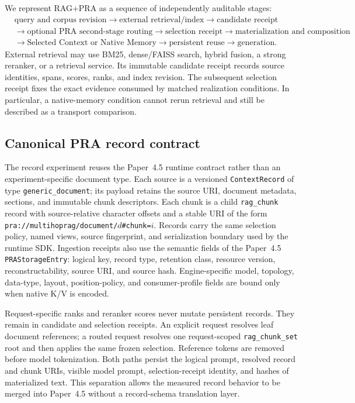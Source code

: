 \documentclass[11pt]{article}
\begin{document}
We represent RAG+PRA as a sequence of independently auditable stages:
\[
\begin{split}
&\text{query and corpus revision}
\rightarrow \text{external retrieval/index}
\rightarrow \text{candidate receipt}\\
&\rightarrow \text{optional PRA second-stage routing}
\rightarrow \text{selection receipt}
\rightarrow \text{materialization and composition}\\
&\rightarrow \text{Selected Context or Native Memory}
\rightarrow \text{persistent reuse}
\rightarrow \text{generation}.
\end{split}
\]
External retrieval may use BM25, dense/FAISS search, hybrid fusion, a strong
reranker, or a retrieval service. Its immutable candidate receipt records
source identities, spans, scores, ranks, and index revision. The subsequent
selection receipt fixes the exact evidence consumed by matched realization
conditions. In particular, a native-memory condition cannot rerun retrieval
and still be described as a transport comparison.

\subsection{Canonical PRA record contract}
The record experiment reuses the Paper~4.5 runtime contract rather than an
experiment-specific document type. Each source is a versioned
\texttt{ContextRecord} of type \texttt{generic\_document}; its payload retains
the source URI, document metadata, sections, and immutable chunk descriptors.
Each chunk is a child \texttt{rag\_chunk} record with source-relative character
offsets and a stable URI of the form
\texttt{pra://multihoprag/document/$d$\#chunk=$i$}. Records carry the same
selection policy, named views, source fingerprint, and serialization boundary
used by the runtime SDK. Ingestion receipts also use the semantic fields of
the Paper~4.5 \texttt{PRAStorageEntry}: logical key, record type, retention
class, resource version, reconstructability, source URI, and source hash.
Engine-specific model, topology, data-type, layout, position-policy, and
consumer-profile fields are bound only when native K/V is encoded.

Request-specific ranks and reranker scores never mutate persistent records.
They remain in candidate and selection receipts. An explicit request resolves
leaf document references; a routed request resolves one request-scoped
\texttt{rag\_chunk\_set} root and then applies the same frozen selection.
Reference tokens are removed before model tokenization. Both paths persist the
logical prompt, resolved record and chunk URIs, visible model prompt,
selection-receipt identity, and hashes of materialized text. This separation
allows the measured record behavior to be merged into Paper~4.5 without a
record-schema translation layer.
\end{document}
